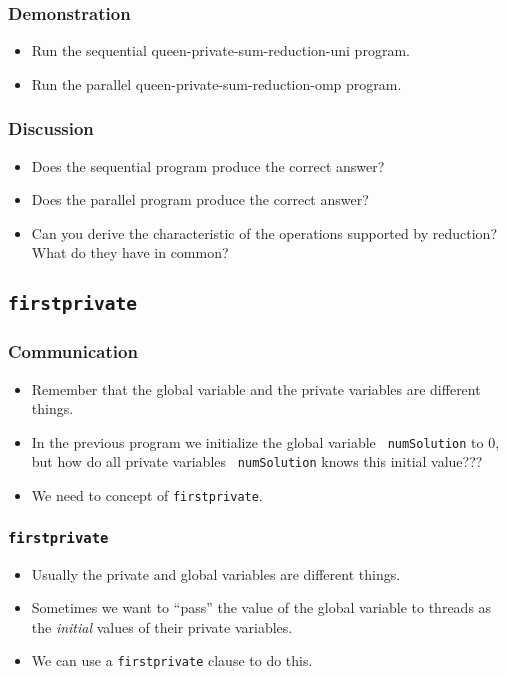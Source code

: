 \documentclass{beamer}
\begin{document}
\begin{frame}
\frametitle{Demonstration}
\begin{itemize}
\item Run the sequential queen-private-sum-reduction-uni program.
\item Run the parallel queen-private-sum-reduction-omp program.
\end{itemize}
\end{frame}

\begin{frame}
\frametitle{Discussion}
\begin{itemize}
\item Does the sequential program produce the correct answer?
\item Does the parallel program produce the correct answer?
\item Can you derive the characteristic of the operations supported by
  reduction?  What do they have in common?
\end{itemize}
\end{frame}


\subsection{\tt firstprivate}

\begin{frame}
\frametitle{Communication}
\begin{itemize}
\item Remember that the global variable and the private variables are
  different things.
\item In the previous program we initialize the global variable {\tt
  numSolution} to 0, but how do all private variables {\tt
  numSolution} knows this initial value???
\item We need to concept of {\tt firstprivate}.
\end{itemize}
\end{frame}

\begin{frame}
\frametitle{\tt firstprivate}
\begin{itemize}
\item Usually the private and global variables are different things.
\item Sometimes we want to ``pass'' the value of the global variable
  to threads as the {\em initial} values of their private variables.
\item We can use a {\tt firstprivate} clause to do this.
\end{itemize}
\end{frame}
\end{document}
